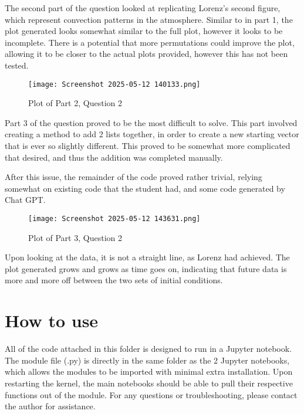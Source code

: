 \documentclass{article}
\begin{document}
The second part of the question looked at replicating Lorenz's second figure, which represent convection patterns in the atmosphere. Similar to in part 1, the plot generated looks somewhat similar to the full plot, however it looks to be incomplete. There is a potential that more permutations could improve the plot, allowing it to be closer to the actual plots provided, however this has not been tested.

\begin{figure}[H]
    \centering
    \texttt{[image: Screenshot 2025-05-12 140133.png]}
    \caption{Plot of Part 2, Question 2}
    \label{Figure 3}
\end{figure}

Part 3 of the question proved to be the most difficult to solve. This part involved creating a method to add 2 lists together, in order to create a new starting vector that is ever so slightly different. This proved to be somewhat more complicated that desired, and thus the addition was completed manually.



After this issue, the remainder of the code proved rather trivial, relying somewhat on existing code that the student had, and some code generated by Chat GPT.


\begin{figure}[H]
    \centering
    \texttt{[image: Screenshot 2025-05-12 143631.png]}
    \caption{Plot of Part 3, Question 2}
    \label{Figure 4}
\end{figure}

Upon looking at the data, it is not a straight line, as Lorenz had achieved. The plot generated grows and grows as time goes on, indicating that future data is more and more off between the two sets of initial conditions.

\section{How to use}

All of the code attached in this folder is designed to run in a Jupyter notebook. The module file (.py) is directly in the same folder as the 2 Jupyter notebooks, which allows the modules to be imported with minimal extra installation. Upon restarting the kernel, the main notebooks should be able to pull their respective functions out of the module. For any questions or troubleshooting, please contact the author for assistance.
\end{document}

